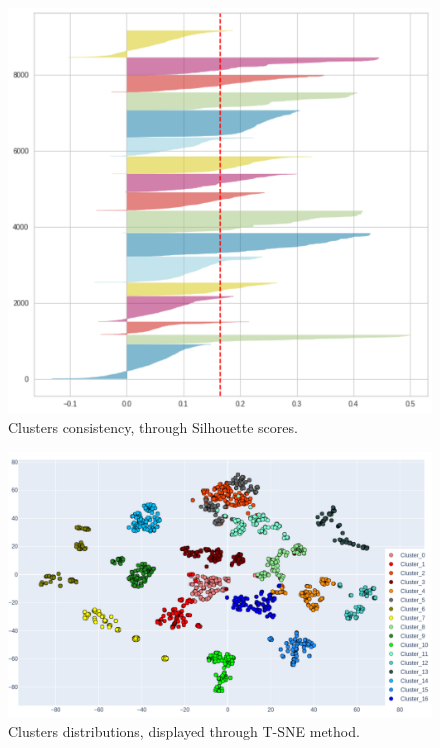 \begin{figure}[ht!]
    \centering
    \includegraphics[width=\linewidth]{images/pre/silhouette_opc2_clustering.pdf}
\caption{Clusters consistency, through Silhouette scores.}
\label{fig:silohuette}
\end{figure}

\begin{figure}[ht!]
    \centering
    \includegraphics[width=\linewidth]{images/pre/plot2d_opc2_clustering.pdf}
\caption{Clusters distributions, displayed through T-SNE method.}
\label{fig:clustering2d}
\end{figure}



